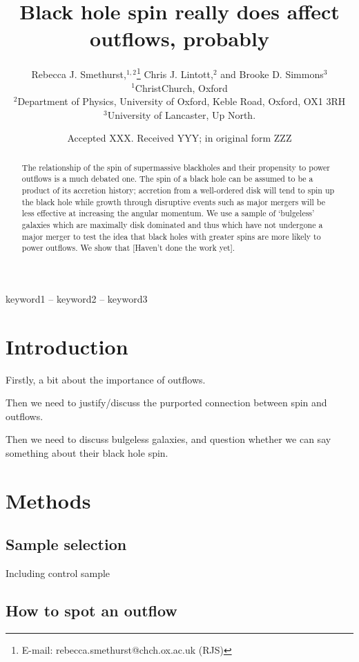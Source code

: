 \documentclass[a4paper,fleqn,usenatbib]{mnras}
\title[Bulgeless galaxies, black hole spin and outflows]{Black hole spin really does affect outflows, probably}
\author[Smethurst, Lintott and Simmons]{
Rebecca J. Smethurst,$^{1,2}$\thanks{E-mail: rebecca.smethurst@chch.ox.ac.uk (RJS)}
Chris J. Lintott,$^{2}$
and Brooke D. Simmons$^{3}$
\\
$^{1}$ChristChurch, Oxford\\
$^{2}$Department of Physics, University of Oxford, Keble Road, Oxford, OX1 3RH\\
$^{3}$University of Lancaster, Up North.}
\date{Accepted XXX. Received YYY; in original form ZZZ}
\begin{document}
\label{firstpage}
\pagerange{\pageref{firstpage}--\pageref{lastpage}}
\maketitle

\begin{abstract}
The relationship of the spin of supermassive blackholes and their propensity to power outflows is a much debated one. The spin of a black hole can be assumed to be a product of its accretion history; accretion from a well-ordered disk will tend to spin up the black hole while growth through disruptive events such as major mergers will be less effective at increasing the angular momentum. We use a sample of `bulgeless' galaxies which are maximally disk dominated and thus which have not undergone a major merger to test the idea that black holes with greater spins are more likely to power outflows. We show that [Haven't done the work yet]. 
\end{abstract}

\begin{keywords}
keyword1 -- keyword2 -- keyword3
\end{keywords}



\section{Introduction}

Firstly, a bit about the importance of outflows.

Then we need to justify/discuss the purported connection between spin and outflows.

Then we need to discuss bulgeless galaxies, and question whether we can say something about their black hole spin.

\section{Methods}
\subsection{Sample selection}
Including control sample
\subsection{How to spot an outflow}
\end{document}

